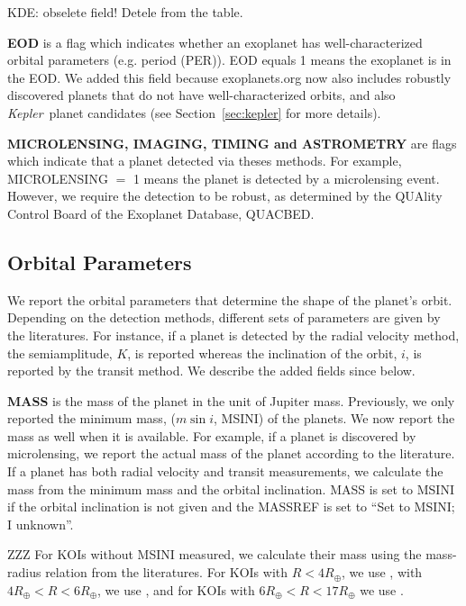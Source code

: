 \documentclass[11pt,preprint]{aastex}
\def\kepler{\textit{Kepler}}
\def\rearth{R_\oplus}
\begin{document}
\begin{CJK*}{UTF8}{gbsn}
KDE: obselete field! Detele from the table.

{\bf EOD} is a flag which indicates whether an exoplanet has well-characterized orbital parameters (e.g. period (PER)). EOD equals 1 means the exoplanet is in the EOD. We added this field because exoplanets.org now also includes robustly discovered planets that do not have well-characterized orbits, and also \kepler\ planet candidates (see Section~\ref{sec:kepler} for more details).


{\bf MICROLENSING, IMAGING, TIMING and ASTROMETRY} are flags which indicate that a planet detected via theses methods. For example, MICROLENSING $=$ 1 means the planet is detected by a microlensing event. However, we require the detection to be robust, as determined by the QUAlity Control Board of the Exoplanet Database, QUACBED. 


\subsection{Orbital Parameters}
We report the orbital parameters that determine the shape of the planet's orbit. Depending on the detection methods, different sets of parameters are given by the literatures. For instance, if a planet is detected by the radial velocity method, the semiamplitude, $K$, is reported whereas the inclination of the orbit, $i$, is reported by the transit method. We describe the added fields since \cite{Wright2011} below. 


{\bf MASS} is the mass of the planet in the unit of Jupiter mass. Previously, we only reported the minimum mass, ($m\sin{i}$, MSINI) of the planets. We now report the mass as well when it is available. For example, if a planet is discovered by microlensing, we report the actual mass of the planet according to the literature. If a planet has both radial velocity and transit measurements, we calculate the mass from the minimum mass and the orbital inclination. MASS is set to MSINI if the orbital inclination is not given and the MASSREF is set to ``Set to MSINI; I unknown''. 

ZZZ For KOIs without MSINI measured, we calculate their mass using the mass-radius relation from the literatures. For KOIs with $R<4\rearth$, we use \cite{Weiss2014} , with $4\rearth<R<6\rearth$, we use \cite{Lissauer2011}, and for KOIs with $6\rearth<R<17\rearth$ we use \cite{Mordasini2012}. 




\end{CJK*}
\end{document}
